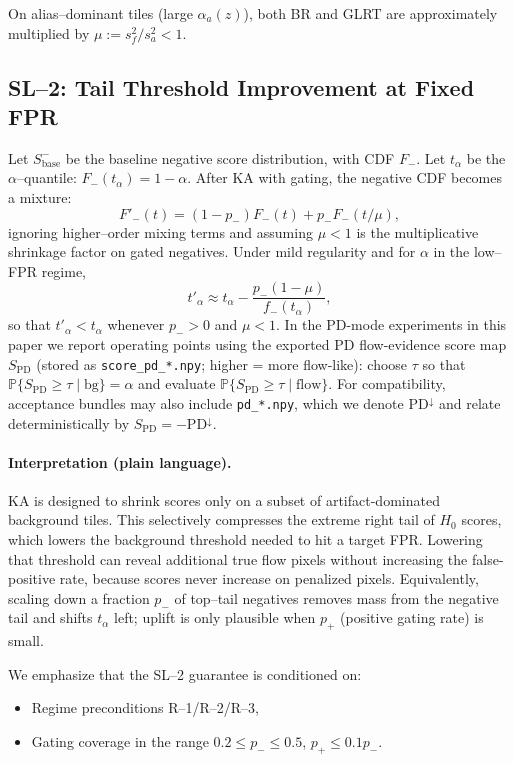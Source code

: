 On alias--dominant tiles (large $\alpha_a(z)$), both BR and GLRT are approximately multiplied by $\mu := s_f^2/s_a^2<1$.

\subsection{SL--2: Tail Threshold Improvement at Fixed FPR}

Let $S^-_{\text{base}}$ be the baseline negative score distribution, with CDF $F_-$. Let $t_\alpha$ be the $\alpha$--quantile: $F_-(t_\alpha) = 1-\alpha$. After KA with gating, the negative CDF becomes a mixture:
\[
F'_-(t) = (1-p_-) F_-(t) + p_- F_-(t/\mu),
\]
ignoring higher--order mixing terms and assuming $\mu<1$ is the multiplicative shrinkage factor on gated negatives. Under mild regularity and for $\alpha$ in the low--FPR regime,
\[
t'_\alpha \approx t_\alpha - \frac{p_-(1-\mu)}{f_-(t_\alpha)},
\]
so that $t'_\alpha < t_\alpha$ whenever $p_->0$ and $\mu<1$.
In the PD-mode experiments in this paper we report operating points using the exported PD flow-evidence score map $S_{\mathrm{PD}}$ (stored as \texttt{score\_pd\_*.npy}; higher = more flow-like): choose $\tau$ so that $\mathbb{P}\{S_{\mathrm{PD}}\ge\tau\mid \mathrm{bg}\}=\alpha$ and evaluate $\mathbb{P}\{S_{\mathrm{PD}}\ge\tau\mid \mathrm{flow}\}$. For compatibility, acceptance bundles may also include \texttt{pd\_*.npy}, which we denote $\mathrm{PD}^{\downarrow}$ and relate deterministically by $S_{\mathrm{PD}}=-\mathrm{PD}^{\downarrow}$.

\paragraph{Interpretation (plain language).}
KA is designed to shrink scores only on a subset of artifact-dominated background tiles. This selectively compresses the extreme right tail of $H_0$ scores, which lowers the background threshold needed to hit a target FPR. Lowering that threshold can reveal additional true flow pixels without increasing the false-positive rate, because scores never increase on penalized pixels. Equivalently, scaling down a fraction $p_-$ of top--tail negatives removes mass from the negative tail and shifts $t_\alpha$ left; uplift is only plausible when $p_+$ (positive gating rate) is small.

We emphasize that the SL--2 guarantee is conditioned on:
\begin{itemize}[nosep]
  \item Regime preconditions R--1/R--2/R--3,
  \item Gating coverage in the range $0.2\le p_-\le 0.5$, $p_+\le 0.1p_-$.
\end{itemize}

